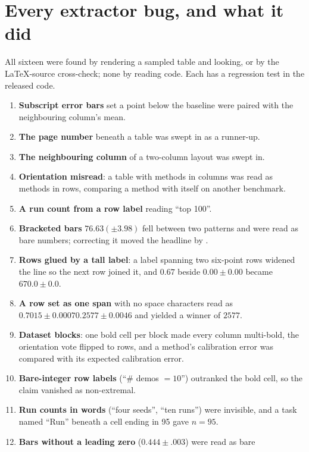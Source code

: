 \documentclass{article}
\begin{document}


\section{Every extractor bug, and what it did}
\label{app:bugs}

All sixteen were found by rendering a sampled table and looking, or by the
LaTeX-source cross-check; none by reading code. Each has a regression test in the released code.

\begin{enumerate}
\item \textbf{Subscript error bars} set a point below the baseline were paired
  with the neighbouring column's mean.
\item \textbf{The page number} beneath a table was swept in as a runner-up.
\item \textbf{The neighbouring column} of a two-column layout was swept in.
\item \textbf{Orientation misread}: a table with methods in columns was read as
  methods in rows, comparing a method with itself on another benchmark.
\item \textbf{A run count from a row label} reading ``top 100''.
\item \textbf{Bracketed bars} $76.63(\pm 3.98)$ fell between two patterns and
  were read as bare numbers; correcting it moved the headline by
  \nHeadlineMoveSixth{}.
\item \textbf{Rows glued by a tall label}: a label spanning two six-point rows
  widened the line so the next row joined it, and $0.67$ beside $0.00 \pm 0.00$
  became $670.0 \pm 0.0$.
\item \textbf{A row set as one span} with no space characters read as
  $0.7015{\pm}0.00070.2577{\pm}0.0046$ and yielded a winner of $2577$.
\item \textbf{Dataset blocks}: one bold cell per block made every column
  multi-bold, the orientation vote flipped to rows, and a method's calibration
  error was compared with its expected calibration error.
\item \textbf{Bare-integer row labels} (``\# demos $=10$'') outranked the bold
  cell, so the claim vanished as non-extremal.
\item \textbf{Run counts in words} (``four seeds'', ``ten runs'') were invisible,
  and a task named ``Run'' beneath a cell ending in 95 gave $n=95$.
\item \textbf{Bars without a leading zero} ($0.444 \pm .003$) were read as bare

\end{enumerate}
\end{document}
